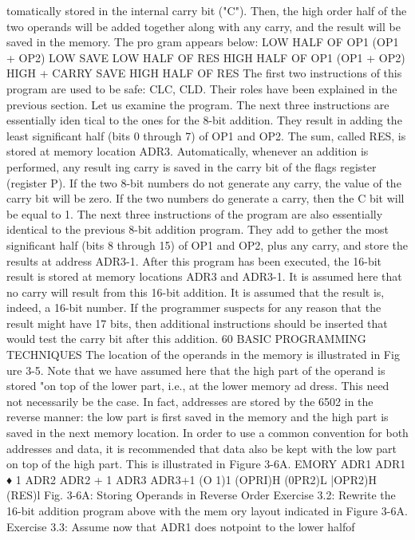 tomatically stored in the internal carry bit ("C"). Then, the high
order half of the two operands will be added together along with
any carry, and the result will be saved in the memory. The pro
gram appears below:
LOW HALF OF OP1
(OP1 + OP2) LOW
SAVE LOW HALF OF RES
HIGH HALF OF OP1
(OP1 + OP2) HIGH + CARRY
SAVE HIGH HALF OF RES
The first two instructions of this program are used to be safe: CLC,
CLD. Their roles have been explained in the previous section. Let us
examine the program. The next three instructions are essentially iden
tical to the ones for the 8-bit addition. They result in adding the least
significant half (bits 0 through 7) of OP1 and OP2. The sum, called
RES, is stored at memory location ADR3.
Automatically, whenever an addition is performed, any result
ing carry is saved in the carry bit of the flags register (register P).
If the two 8-bit numbers do not generate any carry, the value of
the carry bit will be zero. If the two numbers do generate a carry,
then the C bit will be equal to 1.
The next three instructions of the program are also essentially
identical to the previous 8-bit addition program. They add to
gether the most significant half (bits 8 through 15) of OP1 and
OP2, plus any carry, and store the results at address ADR3-1.
After this program has been executed, the 16-bit result is stored
at memory locations ADR3 and ADR3-1.
It is assumed here that no carry will result from this 16-bit
addition. It is assumed that the result is, indeed, a 16-bit number.
If the programmer suspects for any reason that the result might
have 17 bits, then additional instructions should be inserted that
would test the carry bit after this addition.
60
BASIC PROGRAMMING TECHNIQUES
The location of the operands in the memory is illustrated in Fig
ure 3-5.
Note that we have assumed here that the high part of the operand
is stored "on top of the lower part, i.e., at the lower memory ad
dress. This need not necessarily be the case. In fact, addresses
are stored by the 6502 in the reverse manner: the low part is first
saved in the memory and the high part is saved in the next
memory location. In order to use a common convention for both
addresses and data, it is recommended that data also be kept with
the low part on top of the high part. This is illustrated in Figure
3-6A.
EMORY
ADR1
ADR1 ♦ 1
ADR2
ADR2 + 1
ADR3
ADR3+1
(O 1)1
(OPRI)H
(0PR2)L
|OPR2)H
(RES)l
Fig. 3-6A: Storing Operands in Reverse Order
Exercise 3.2: Rewrite the 16-bit addition program above with the mem
ory layout indicated in Figure 3-6A.
Exercise 3.3: Assume now that ADR1 does notpoint to the lower halfof

